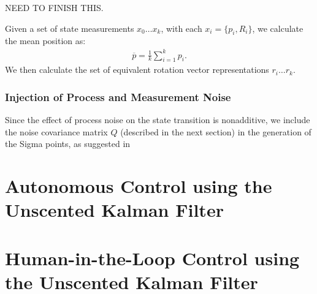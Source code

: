 NEED TO FINISH THIS.

Given a set of state measurements $x_0 \dots x_k$, with each $x_i = \{p_i,R_i\}$, we calculate the mean position as:
\begin{align}
\overline{p} = \frac{1}{k}\sum\limits_{i=1}^{k} p_i.
\end{align}
We then calculate the set of equivalent rotation vector representations $r_i \dots r_k$.

\subsubsection{Injection of Process and Measurement Noise}
Since the effect of process noise on the state transition is nonadditive, we include the noise covariance matrix $Q$ (described in the next section) in the generation of the Sigma points, as suggested in
 
\section[Autonomous Control using the UKF]{Autonomous Control using the Unscented Kalman Filter}
\label{sec:AutonomousControl}



\section[Human-in-the-Loop Control using the UKF]{Human-in-the-Loop Control using the Unscented Kalman Filter}
\label{sec:HumanInTheLoopControl}